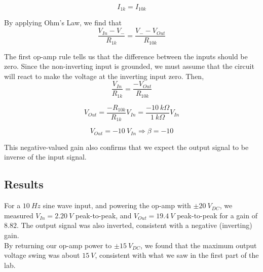 \documentclass[11pt]{article}
\begin{document}
\begin{equation}
    I_{1k} = I_{10k}
\end{equation}

By applying Ohm's Law, we find that\\

\begin{equation}
    \frac{V_{In} - V_{-}}{R_{1k}} = \frac{V_{-} - V_{Out}}{R_{10k}}
\end{equation}

The first op-amp rule tells us that the difference between the inputs should be zero. Since the non-inverting input is grounded, we must assume that the circuit will react to make the voltage at the inverting input zero. Then,\\

\begin{equation}
    \frac{V_{In}}{R_{1k}} = \frac{-V_{Out}}{R_{10k}}
\end{equation}

\begin{equation}
    V_{Out} = \frac{-R_{10k}}{R_{1k}} V_{In} = \frac{-10\ k \Omega}{1\ k \Omega} V_{In}
\end{equation}

\begin{equation}
    V_{Out} = -10\ V_{In} \Longrightarrow \beta = -10
\end{equation}

This negative-valued gain also confirms that we expect the output signal to be inverse of the input signal.\\


\subsection{Results}

For a $10\ Hz$ sine wave input, and powering the op-amp with $\pm 20\ V_{DC}$, we measured $V_{In} = 2.20\ V$ peak-to-peak, and $V_{Out} = 19.4\ V$ peak-to-peak for a gain of $8.82$. The output signal was also inverted, consistent with a negative (inverting) gain.\\

By returning our op-amp power to $\pm 15\ V_{DC}$, we found that the maximum output voltage swing was about $15\ V$, consistent with what we saw in the first part of the lab. \\
\end{document}
